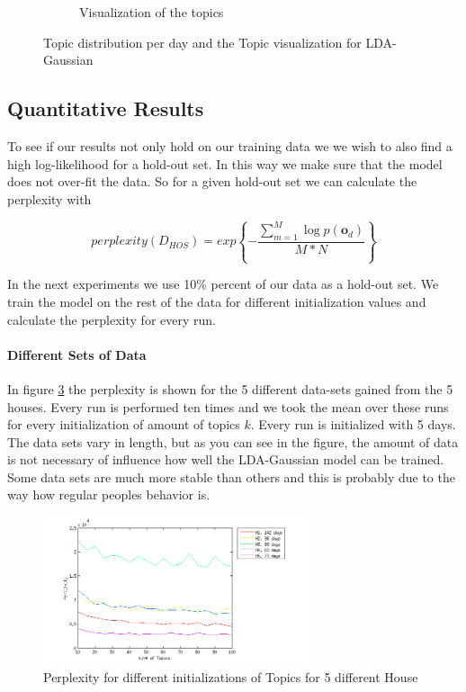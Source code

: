 \documentclass[a4paper,fleqn]{article}
\begin{document}
\begin{figure}[h!]
\begin{subfigure}[b]{0.45\linewidth}
  \caption{Visualization of the topics}
  \label{fig:GausTopVisu48}
 \end{subfigure}
 \caption{Topic distribution per day and the Topic visualization for LDA-Gaussian}
 \label{fig:Gaus48}
\end{figure}


\pagebreak


\subsection{Quantitative Results}
To see if our results not only hold on our training data we we wish to also find a high log-likelihood for a hold-out set. In this way we make sure that the model does not over-fit the data. So for a given hold-out set we can calculate the perplexity with 

\begin{equation}
 perplexity(D_{HOS}) = exp \left\{ - \frac{\sum_{m=1}^M \log p(\textbf{o}_d ) }{M*N} \right\}
\end{equation}

In the next experiments we use 10\% percent of our data as a hold-out set. We train the model on the rest of the data for different initialization values and calculate the perplexity for every run.

\paragraph{Different Sets of Data}
In figure \ref{fig:PerplGaus} the perplexity is shown for the 5 different data-sets gained from the 5 houses. Every run is performed ten times and we took the mean over these runs for every initialization of amount of topics $k$. Every run is initialized with 5 days.
The data sets vary in length, but as you can see in the figure, the amount of data is not necessary of influence how well the LDA-Gaussian model can be trained. Some data sets are much more stable than others and this is probably due to the way how regular peoples behavior is.

\begin{figure}[h!]
 \centering
 \includegraphics[width=0.7\textwidth]{Pictures/PerplGaus.png}
 \caption{Perplexity for different initializations of Topics for 5 different House}
 \label{fig:PerplGaus}
\end{figure}
\end{document}
